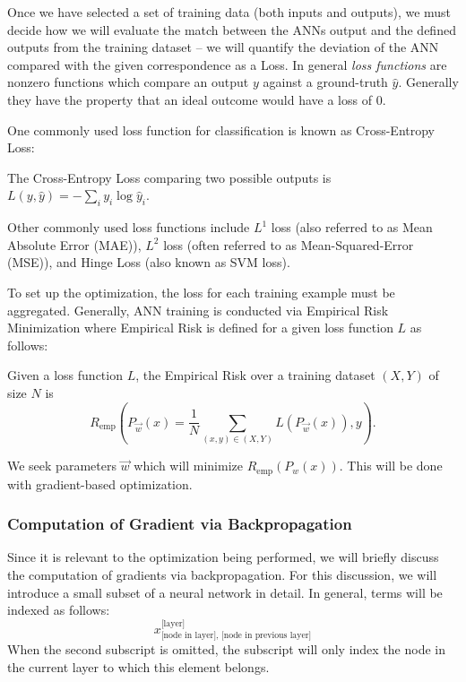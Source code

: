 Once we have selected a set of training data (both inputs and outputs), we must decide how we will evaluate the match between the ANNs output and the defined outputs from the training dataset -- we will quantify the deviation of the ANN compared with the given correspondence as a Loss. In general \emph{loss functions} are nonzero functions which compare an output $y$ against a ground-truth $\hat y$. Generally they have the property that an ideal outcome would have a loss of 0. 

One commonly used loss function for classification is known as Cross-Entropy Loss:
\begin{definition}{The Cross-Entropy Loss comparing two possible outputs is}
$L(y,\hat y) = -\sum_i y_i \log \hat y_i$.
\end{definition}
Other commonly used loss functions include $L^1$ loss (also referred to as Mean Absolute Error (MAE)), $L^2$ loss (often referred to as Mean-Squared-Error (MSE)), and Hinge Loss (also known as SVM loss). 

To set up the optimization, the loss for each training example must be aggregated. Generally, ANN training is conducted via Empirical Risk Minimization where Empirical Risk is defined for a given loss function $L$ as follows:
\begin{definition}{Given a loss function $L$, the Empirical Risk over a training dataset $(X,Y)$ of size $N$ is }
\[R_{\text{emp}}(P_{\vec w}(x) = \dfrac{1}{N} \sum_{(x,y) \in (X,Y)} L(P_{\vec w}(x)), y).\]
\end{definition}
We seek parameters $\vec w$ which will minimize $R_{\text{emp}}(P_{w}(x))$. This will be done with gradient-based optimization. 

\subsubsection{Computation of Gradient via Backpropagation}

Since it is relevant to the optimization being performed, we will briefly discuss the computation of gradients via backpropagation. For this discussion, we will introduce a small subset of a neural network in detail. In general, terms will be indexed as follows:
\[ x^{\text{[layer]}}_{\text{[node in layer], [node in previous layer]}}\]
When the second subscript is omitted, the subscript will only index the node in the current layer to which this element belongs. 

